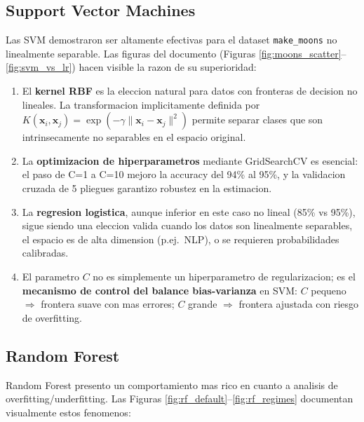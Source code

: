 \documentclass[12pt,a4paper]{article}
\begin{document}
\subsection{Support Vector Machines}

Las SVM demostraron ser altamente efectivas para el dataset \texttt{make\_moons} no linealmente
separable. Las figuras del documento (Figuras \ref{fig:moons_scatter}--\ref{fig:svm_vs_lr})
hacen visible la razon de su superioridad:

\begin{enumerate}[label=\textbf{\arabic*.}]
  \item El \textbf{kernel RBF} es la eleccion natural para datos con fronteras de decision no
    lineales. La transformacion implicitamente definida por
    $K(\mathbf{x}_i, \mathbf{x}_j) = \exp(-\gamma \|\mathbf{x}_i - \mathbf{x}_j\|^2)$
    permite separar clases que son intrinsecamente no separables en el espacio original.

  \item La \textbf{optimizacion de hiperparametros} mediante GridSearchCV es esencial: el paso
    de C=1 a C=10 mejoro la accuracy del 94\% al 95\%, y la validacion cruzada de 5 pliegues
    garantizo robustez en la estimacion.

  \item La \textbf{regresion logistica}, aunque inferior en este caso no lineal (85\% vs 95\%),
    sigue siendo una eleccion valida cuando los datos son linealmente separables, el espacio es
    de alta dimension (p.ej.\ NLP), o se requieren probabilidades calibradas.

  \item El parametro $C$ no es simplemente un hiperparametro de regularizacion; es el
    \textbf{mecanismo de control del balance bias-varianza} en SVM: $C$ pequeno $\Rightarrow$
    frontera suave con mas errores; $C$ grande $\Rightarrow$ frontera ajustada con riesgo de
    overfitting.
\end{enumerate}

\subsection{Random Forest}

Random Forest presento un comportamiento mas rico en cuanto a analisis de overfitting/underfitting.
Las Figuras \ref{fig:rf_default}--\ref{fig:rf_regimes} documentan visualmente estos fenomenos:
\end{document}
